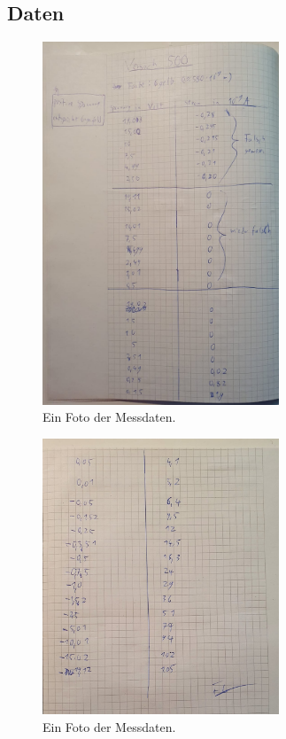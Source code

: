 \subsection{Daten}
\begin{figure}[H]
    \centering
    \includegraphics[width=0.63\textwidth]{latex/images/D1.jpeg}
    \caption{Ein Foto der Messdaten.}
    \label{img:Daten1}
\end{figure}
\begin{figure}[H]
    \centering
    \includegraphics[width=0.63\textwidth]{latex/images/D2.jpeg}
    \caption{Ein Foto der Messdaten.}
    \label{img:Daten2}
\end{figure}
